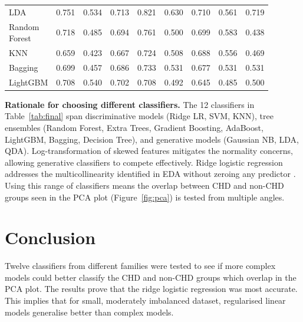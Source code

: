 \documentclass[12pt,a4paper]{article}
\begin{document}
\begin{table}[htbp]
{\begin{tabular}{@{}lrrr|rrrrr@{}}
LDA               & 0.751 & 0.534 & 0.713 & 0.821 & 0.630 & 0.710 & 0.561 & 0.719 \\
\shortstack[l]{Random\\Forest} & 0.718 & 0.485 & 0.694 & 0.761 & 0.500 & 0.699 & 0.583 & 0.438 \\[4pt]
KNN               & 0.659 & 0.423 & 0.667 & 0.724 & 0.508 & 0.688 & 0.556 & 0.469 \\
Bagging           & 0.699 & 0.457 & 0.686 & 0.733 & 0.531 & 0.677 & 0.531 & 0.531 \\
LightGBM          & 0.708 & 0.540 & 0.702 & 0.708 & 0.492 & 0.645 & 0.485 & 0.500 \\
\bottomrule
\end{tabular}}
\end{table}
\newline
\textbf{Rationale for choosing different classifiers.}
The 12 classifiers in Table~\ref{tab:final} span discriminative models
(Ridge LR, SVM, KNN), tree ensembles (Random Forest, Extra Trees, Gradient
Boosting, AdaBoost, LightGBM, Bagging, Decision Tree), and generative
models (Gaussian NB, LDA, QDA). Log-transformation of skewed features
mitigates the normality concerns, allowing generative classifiers to compete
effectively. Ridge logistic regression addresses the multicollinearity
identified in EDA without zeroing any predictor
\cite{hassan2022effectively}. Using this range of classifiers means the overlap between
CHD and non-CHD groups seen in the PCA plot (Figure~\ref{fig:pca})
is tested from multiple angles.

\section{Conclusion}
Twelve classifiers from different families were tested to see if more complex models could
better classify the CHD and non-CHD groups which overlap in the PCA plot. The results 
prove that the ridge logistic regression was most accurate. This implies that for small, 
moderately imbalanced dataset, regularised linear
models generalise better than complex models.

\newpage


\end{document}
